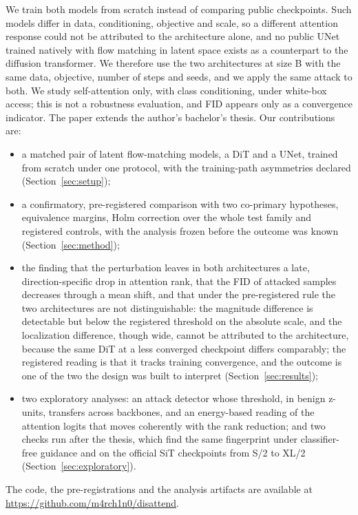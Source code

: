 \documentclass{article}
\begin{document}
We train both models from scratch instead of comparing public checkpoints. Such models differ in data, conditioning, objective and scale, so a different attention response could not be attributed to the architecture alone, and no public UNet trained natively with flow matching in latent space exists as a counterpart to the diffusion transformer. We therefore use the two architectures at size B with the same data, objective, number of steps and seeds, and we apply the same attack to both. We study self-attention only, with class conditioning, under white-box access; this is not a robustness evaluation, and FID appears only as a convergence indicator. The paper extends the author's bachelor's thesis. Our contributions are:
\begin{itemize}[noitemsep, topsep=2pt, parsep=0pt, partopsep=0pt, leftmargin=*]
  \item a matched pair of latent flow-matching models, a DiT and a UNet, trained from scratch under one protocol, with the training-path asymmetries declared (Section~\ref{sec:setup});
  \item a confirmatory, pre-registered comparison with two co-primary hypotheses, equivalence margins, Holm correction over the whole test family and registered controls, with the analysis frozen before the outcome was known (Section~\ref{sec:method});
  \item the finding that the perturbation leaves in both architectures a late, direction-specific drop in attention rank, that the FID of attacked samples decreases through a mean shift, and that under the pre-registered rule the two architectures are not distinguishable: the magnitude difference is detectable but below the registered threshold on the absolute scale, and the localization difference, though wide, cannot be attributed to the architecture, because the same DiT at a less converged checkpoint differs comparably; the registered reading is that it tracks training convergence, and the outcome is one of the two the design was built to interpret (Section~\ref{sec:results});
  \item two exploratory analyses: an attack detector whose threshold, in benign z-units, transfers across backbones, and an energy-based reading of the attention logits that moves coherently with the rank reduction; and two checks run after the thesis, which find the same fingerprint under classifier-free guidance and on the official SiT checkpoints from S/2 to XL/2 (Section~\ref{sec:exploratory}).
\end{itemize}
The code, the pre-registrations and the analysis artifacts are available at \url{https://github.com/m4rch1n0/disattend}.
\end{document}
